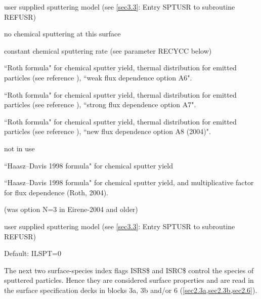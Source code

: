 \begin{description}
\begin{description}
                user supplied sputtering model (see \cref{sec3.3}: Entry SPTUSR to subroutine
                REFUSR)
          \item[M = 0] no chemical sputtering at this surface
          \item[M = 1]
                constant chemical sputtering rate (see parameter RECYCC below)
          \item[M = 2]
                ``Roth formula" for chemical sputter yield, thermal distribution for emitted
                particles (see reference \cite{kn:Roth99}), ``weak flux dependence option A6".
          \item[M = 3] ``Roth formula" for chemical sputter yield, thermal distribution
                for emitted particles (see reference \cite{kn:Roth99}), ``strong flux
                dependence option A7".
          \item[M = 4] ``Roth formula" for chemical sputter yield, thermal distribution
                for emitted particles (see reference \cite{kn:Roth99}), ``new flux dependence
                option A8 (2004)".
          \item[M = 5] not in use
          \item[M = 6] ``Haasz--Davis 1998 formula" for chemical
                sputter yield
          \item[M = 7] ``Haasz--Davis 1998 formula" for chemical sputter
                yield, and multiplicative factor for flux dependence (Roth, 2004).
          \item[M = 9] (was option N=3 in Eirene-2004 and older) 

                user supplied sputtering model (see \cref{sec3.3}: Entry SPTUSR to subroutine
                REFUSR)
        \end{description}

        Default: ILSPT=0
\end{description}
The next two surface-species index flags
ISRS\$ and ISRC\$ control the species of sputtered particles.
Hence they are considered surface properties and are read in the surface
specification decks in blocks 3a, 3b and/or 6 (\cref{sec2.3a,sec2.3b,sec2.6}).
